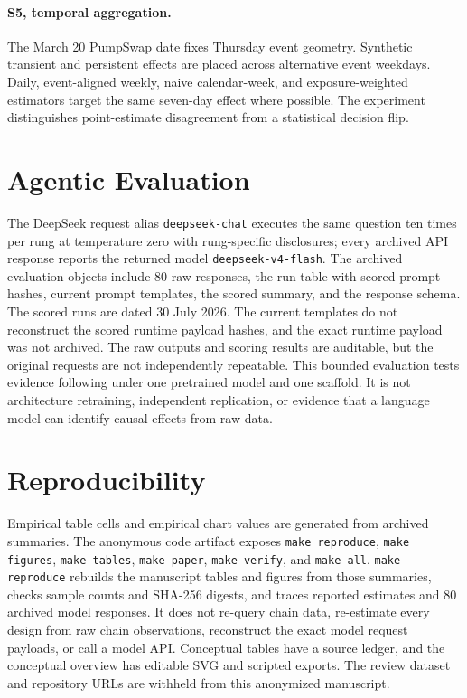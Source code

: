 \documentclass{article}
\begin{document}
\paragraph{S5, temporal aggregation.}
The March 20 PumpSwap date fixes Thursday event geometry. Synthetic transient and persistent effects are placed across alternative event weekdays. Daily, event-aligned weekly, naive calendar-week, and exposure-weighted estimators target the same seven-day effect where possible. The experiment distinguishes point-estimate disagreement from a statistical decision flip.

\section{Agentic Evaluation}
\label{app:agent}
\enlargethispage{0.5\baselineskip}

The DeepSeek request alias \texttt{deepseek-chat} executes the same question ten times per rung at temperature zero with rung-specific disclosures; every archived API response reports the returned model \texttt{deepseek-v4-flash}. The archived evaluation objects include 80 raw responses, the run table with scored prompt hashes, current prompt templates, the scored summary, and the response schema. The scored runs are dated 30 July 2026. The current templates do not reconstruct the scored runtime payload hashes, and the exact runtime payload was not archived. The raw outputs and scoring results are auditable, but the original requests are not independently repeatable. This bounded evaluation tests evidence following under one pretrained model and one scaffold. It is not architecture retraining, independent replication, or evidence that a language model can identify causal effects from raw data.

\section{Reproducibility}
\label{app:reproducibility}

Empirical table cells and empirical chart values are generated from archived summaries. The anonymous code artifact exposes \texttt{make reproduce}, \texttt{make figures}, \texttt{make tables}, \texttt{make paper}, \texttt{make verify}, and \texttt{make all}. \texttt{make reproduce} rebuilds the manuscript tables and figures from those summaries, checks sample counts and SHA-256 digests, and traces reported estimates and 80 archived model responses. It does not re-query chain data, re-estimate every design from raw chain observations, reconstruct the exact model request payloads, or call a model API. Conceptual tables have a source ledger, and the conceptual overview has editable SVG and scripted exports. The review dataset and repository URLs are withheld from this anonymized manuscript.
\end{document}
